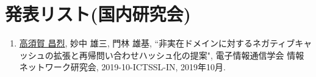 \documentclass[12pt]{jarticle} %
\begin{document}
\appendix

\section{発表リスト(国内研究会)}
\begin{enumerate}
 \item \underline{高須賀 昌烈}, 妙中 雄三, 門林 雄基, ``非実在ドメインに対するネガティブキャッシュの拡張と再帰問い合わせハッシュ化の提案", 電子情報通信学会 情報ネットワーク研究会, 2019-10-ICTSSL-IN, 2019年10月.
\end{enumerate}
\end{document}
